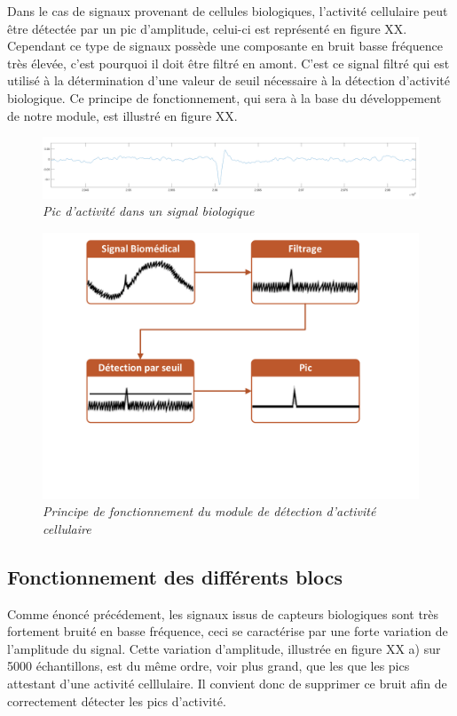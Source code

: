 \documentclass[a4paper,12pt]{article}
\begin{document}
Dans le cas de signaux provenant de cellules biologiques, l'activité cellulaire peut être détectée par un pic d'amplitude, celui-ci est représenté en figure XX. Cependant ce type de signaux possède une composante en bruit basse fréquence très élevée, c'est pourquoi il doit être filtré en amont. C'est ce signal filtré qui est utilisé à la détermination d'une valeur de seuil nécessaire à la détection d'activité biologique. Ce principe de fonctionnement, qui sera à la base du développement de notre module, est illustré en figure XX.\\

\begin{figure}[H]
\centering
\includegraphics[scale=0.18, keepaspectratio]{toto3.png}
\caption{\textit{Pic d'activité dans un signal biologique}}
\end{figure}

\begin{figure}[H]
\centering
\includegraphics[scale=0.5, keepaspectratio]{Dessin1.pdf}
\caption{\textit{Principe de fonctionnement du module de détection d'activité cellulaire}}
\end{figure}
\newpage

\subsection{Fonctionnement des différents blocs}
Comme énoncé précédement, les signaux issus de capteurs biologiques sont très fortement bruité en basse fréquence, ceci se caractérise par une forte variation de l'amplitude du signal. Cette variation d'amplitude, illustrée en figure XX a) sur 5000 échantillons, est du même ordre, voir plus grand, que les que les pics attestant d'une activité celllulaire. Il convient donc de supprimer ce bruit afin de correctement détecter les pics d'activité.\\
\end{document}
